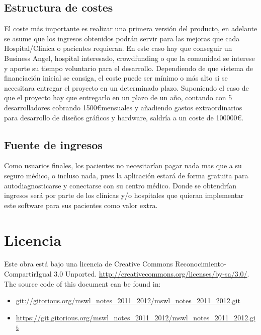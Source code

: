 \documentclass[11pt]{article}
\begin{document}
\subsection{Estructura de costes}
El coste más importante es realizar una primera versión del producto, en adelante se asume que los ingresos obtenidos podrán servir para las mejoras que cada Hospital/Clinica o pacientes requieran. En este caso hay que conseguir un Business Angel, hospital interesado, crowdfunding o que la comunidad se interese y aporte su tiempo voluntario para el desarrollo.
Dependiendo de que sistema de financiación inicial se consiga, el coste puede ser mínimo o más alto si se necesitara entregar el proyecto en un determinado plazo.
Suponiendo el caso de que el proyecto hay que entregarlo en un plazo de un año, contando con 5 desarrolladores cobrando 1500\euro mensuales y añadiendo gastos extraordinarios para desarrollo de diseños gráficos y hardware, saldría a un coste de 100000\euro.

\subsection{Fuente de ingresos}
Como usuarios finales, los pacientes no necesitarían pagar nada mas que a su seguro médico, o incluso nada, pues la aplicación estará de forma gratuita para autodiagnosticarse y conectarse con su centro médico.
Donde se obtendrían ingresos será por parte de los clínicas y/o hospitales que quieran implementar este software para sus pacientes como valor extra.

\section{Licencia}
Este obra está bajo una licencia de Creative Commons Reconocimiento-CompartirIgual 3.0 Unported. \url{http://creativecommons.org/licenses/by-sa/3.0/}.
The source code of this document can be found in:
	\begin{itemize}
		\item \url{git://gitorious.org/mswl_notes_2011_2012/mswl_notes_2011_2012.git}
		\item \url{https://git.gitorious.org/mswl_notes_2011_2012/mswl_notes_2011_2012.git}
	\end{itemize}
    \begin{center}
    \end{center}
\end{document}
